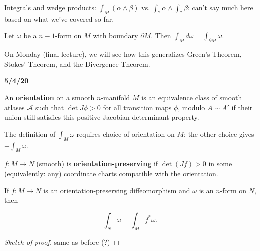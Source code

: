 Integrals and wedge products: \(\int_M ( \alpha \wedge \beta) \) vs. \(\int_{\text{?}} \alpha \wedge \int_{\text{?}} \beta\): can't say much here based on what we've covered so far.

\begin{theorem}

Let \(\omega\) be a \(n-1\)-form on \(M\) with boundary \(\partial M\). Then \(\int_M d \omega = \int_{\partial M} \omega\).

\end{theorem}

On Monday (final lecture), we will see how this generalizes Green's Theorem, Stokes' Theorem, and the Divergence Theorem.

\textbf{5/4/20}

\begin{definition}

An \textbf{orientation} on a smooth \(n\)-manifold \(M\) is an equivalence class of smooth atlases \(\mathcal{A}\) such that \(\operatorname{det}J \phi > 0\) for all transition maps \(\phi\), modulo \(A \sim A'\) if their union still satisfies this positive Jacobian determinant property.

\end{definition}

The definition of \(\int_M \omega\) requires choice of orientation on \(M\); the other choice gives \(-\int_M \omega\).

\begin{definition}

\(f: M \to N\) (smooth) is \textbf{orientation-preserving} if \(\operatorname{det}(Jf) >0\) in some (equivalently: any) coordinate charts compatible with the orientation.

\end{definition}

\begin{theorem}

If \(f: M \to N\) is an orientation-preserving diffeomorphism and \(\omega\) is an \(n\)-form on \(N\), then

\[
\int_N \omega = \int_M f^* \omega.
\]

\end{theorem}

\begin{proof}[Sketch of proof]

same as before (?)

\end{proof}

